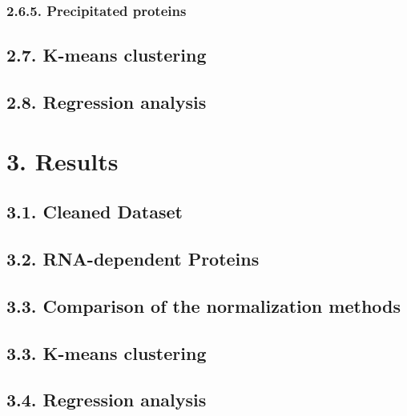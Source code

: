 \documentclass[
]{article}
\begin{document}
\hypertarget{precipitated-proteins}{%
\subsubsection{2.6.5. Precipitated
proteins}\label{precipitated-proteins}}

\hypertarget{k-means-clustering}{%
\subsection{2.7. K-means clustering}\label{k-means-clustering}}

\hypertarget{regression-analysis}{%
\subsection{2.8. Regression analysis}\label{regression-analysis}}

\hypertarget{results}{%
\section{3. Results}\label{results}}

\hypertarget{cleaned-dataset}{%
\subsection{3.1. Cleaned Dataset}\label{cleaned-dataset}}

\hypertarget{rna-dependent-proteins}{%
\subsection{3.2. RNA-dependent Proteins}\label{rna-dependent-proteins}}

\hypertarget{comparison-of-the-normalization-methods}{%
\subsection{3.3. Comparison of the normalization
methods}\label{comparison-of-the-normalization-methods}}

\hypertarget{k-means-clustering-1}{%
\subsection{3.3. K-means clustering}\label{k-means-clustering-1}}

\hypertarget{regression-analysis-1}{%
\subsection{3.4. Regression analysis}\label{regression-analysis-1}}
\end{document}
